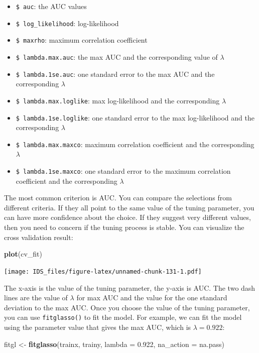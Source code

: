 \documentclass[12pt,]{krantz}
\makeatletter
\newenvironment{Shaded}{\begin{snugshade}}{\end{snugshade}}
\newcommand{\DataTypeTok}[1]{\textcolor[rgb]{0.27,0.27,0.27}{#1}}
\newcommand{\FloatTok}[1]{\textcolor[rgb]{0.06,0.06,0.06}{#1}}
\newcommand{\KeywordTok}[1]{\textcolor[rgb]{0.27,0.27,0.27}{\textbf{#1}}}
\newcommand{\NormalTok}[1]{#1}
\newcommand{\StringTok}[1]{\textcolor[rgb]{0.5,0.5,0.5}{#1}}
\providecommand{\tightlist}{%
  \setlength{\itemsep}{0pt}\setlength{\parskip}{0pt}}
\newenvironment{kframe}{%
\medskip{}
\setlength{\fboxsep}{.8em}
 \def\at@end@of@kframe{}%
 \ifinner\ifhmode%
  \def\at@end@of@kframe{\end{minipage}}%
  \begin{minipage}{\columnwidth}%
 \fi\fi%
 \def\FrameCommand##1{\hskip\@totalleftmargin \hskip-\fboxsep
 \colorbox{shadecolor}{##1}\hskip-\fboxsep
     \hskip-\linewidth \hskip-\@totalleftmargin \hskip\columnwidth}%
 \MakeFramed {\advance\hsize-\width
   \@totalleftmargin\z@ \linewidth\hsize
   \@setminipage}}%
 {\par\unskip\endMakeFramed%
 \at@end@of@kframe}
\renewenvironment{Shaded}{\begin{kframe}}{\end{kframe}}
\makeatother
\begin{document}
\begin{itemize}
\tightlist
\item
  \texttt{\$\ auc}: the AUC values
\item
  \texttt{\$\ log\_likelihood}: log-likelihood
\item
  \texttt{\$\ maxrho}: maximum correlation coefficient
\item
  \texttt{\$\ lambda.max.auc}: the max AUC and the corresponding value of \(\lambda\)
\item
  \texttt{\$\ lambda.1se.auc}: one standard error to the max AUC and the corresponding \(\lambda\)
\item
  \texttt{\$\ lambda.max.loglike}: max log-likelihood and the corresponding \(\lambda\)
\item
  \texttt{\$\ lambda.1se.loglike}: one standard error to the max log-likelihood and the corresponding \(\lambda\)
\item
  \texttt{\$\ lambda.max.maxco}: maximum correlation coefficient and the corresponding \(\lambda\)
\item
  \texttt{\$\ lambda.1se.maxco}: one standard error to the maximum correlation coefficient and the corresponding \(\lambda\)
\end{itemize}

The most common criterion is AUC. You can compare the selections from different criteria. If they all point to the same value of the tuning parameter, you can have more confidence about the choice. If they suggest very different values, then you need to concern if the tuning process is stable. You can visualize the cross validation result:

\begin{Shaded}
\begin{Highlighting}[]
\KeywordTok{plot}\NormalTok{(cv_fit)}
\end{Highlighting}
\end{Shaded}

\texttt{[image: IDS\_files/figure-latex/unnamed-chunk-131-1.pdf]}

The x-axis is the value of the tuning parameter, the y-axis is AUC. The two dash lines are the value of \(\lambda\) for max AUC and the value for the one standard deviation to the max AUC. Once you choose the value of the tuning parameter, you can use \texttt{fitglasso()} to fit the model. For example, we can fit the model using the parameter value that gives the max AUC, which is \(\lambda=0.922\):

\begin{Shaded}
\begin{Highlighting}[]
\NormalTok{fitgl <-}\StringTok{ }\KeywordTok{fitglasso}\NormalTok{(trainx, trainy, }\DataTypeTok{lambda =} \FloatTok{0.922}\NormalTok{, }\DataTypeTok{na_action =}\NormalTok{ na.pass)}
\end{Highlighting}
\end{Shaded}
\end{document}
